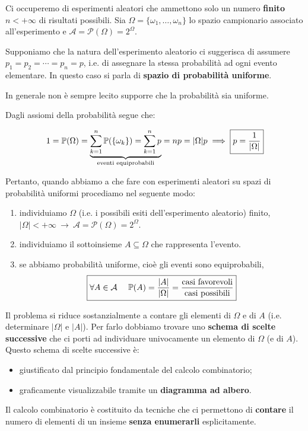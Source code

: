 
\ParteEsercizi

Ci occuperemo di esperimenti aleatori che ammettono solo un numero \textbf{finito} $n< +\infty $ di risultati possibili. Sia $\Omega =\{\omega _{1} ,\dots ,\omega _{n}\}$ lo spazio campionario associato all'esperimento e $\mathcal{A} =\mathcal{P}(\Omega) =2^{\Omega }$.

Supponiamo che la natura dell'esperimento aleatorio ci suggerisca di assumere $p_{1} =p_{2} =\cdots =p_{n} =p$, i.e. di assegnare la stessa probabilità ad ogni evento elementare. In questo caso si parla di \textbf{spazio di probabilità uniforme}.

\begin{oss}
	In generale non è sempre lecito supporre che la probabilità sia uniforme.
\end{oss}

Dagli assiomi della probabilità segue che:

\begin{equation*}
	1=\mathbb{P}(\Omega) =\underbrace{\sum\limits _{k=1}^{n}\mathbb{P}(\{\omega _{k}\}) =\sum\limits _{k=1}^{n} p}_{\text{eventi equiprobabili}} =np=| \Omega | p\implies \boxed{p=\frac{1}{| \Omega | }}
\end{equation*}

Pertanto, quando abbiamo a che fare con esperimenti aleatori su spazi di probabilità uniformi procediamo nel seguente modo:
\begin{enumerate}
	\item individuiamo $\Omega $ (i.e. i possibili esiti dell'esperimento aleatorio) finito, $| \Omega | < +\infty \ \rightarrow \ \mathcal{A} =\mathcal{P}(\Omega) =2^{\Omega }$.
	\item individuiamo il sottoinsieme $A\subseteq \Omega $ che rappresenta l'evento.
	\item se abbiamo probabilità uniforme, cioè gli eventi sono equiprobabili,
	\begin{equation*}
		\boxed{\forall A\in \mathcal{A} \ \ \ \ \mathbb{P}(A) =\frac{| A| }{| \Omega | } =\frac{\text{casi favorevoli}}{\text{casi possibili}}}
	\end{equation*}
\end{enumerate}
Il problema si riduce sostanzialmente a contare gli elementi di $\Omega $ e di $A$ (i.e. determinare $| \Omega | $ e $|A| $). Per farlo dobbiamo trovare uno \textbf{schema di scelte successive} che ci porti ad individuare univocamente un elemento di $\Omega $ (e di $A$). Questo schema di scelte successive è:
\begin{itemize}
	\item giustificato dal principio fondamentale del calcolo combinatorio;
	\item graficamente visualizzabile tramite un \textbf{diagramma ad albero}.
\end{itemize}
Il calcolo combinatorio è costituito da tecniche che ci permettono di \textbf{contare} il numero di elementi di un insieme \textbf{senza enumerarli} esplicitamente.

